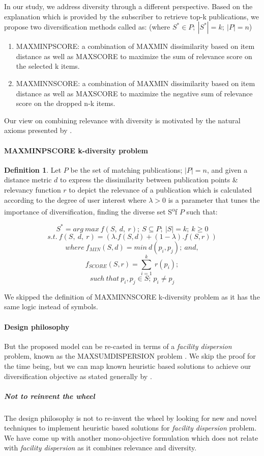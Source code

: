 \documentclass[a4paper,12pt,oneside]{book}
\theoremstyle{definition}
\newtheorem{definition}{Definition}[section]
\theoremstyle{remark}
\begin{document}
In our study, we address diversity through a different perspective. Based on the explanation which is provided by the subscriber to retrieve top-k publications, we propose two diversification methods called as: (where $S^* \in P;\ |S^*|=k;\ |P|=n$)
\begin{enumerate}
\item MAXMINPSCORE: a combination of MAXMIN dissimilarity based on item distance as well as MAXSCORE to maximize the sum of relevance score on the selected k items. 
\item MAXMINNSCORE: a combination of MAXMIN dissimilarity based on item distance as well as MAXSCORE to maximize the negative sum of relevance score on the dropped n-k items.
\end{enumerate}

Our view on combining relevance with diversity is motivated by the natural axioms presented by \cite{Gollapudi2009}. 

\paragraph*{MAXMINPSCORE k-diversity problem}
\begin{definition}
Let $P$ be the set of matching publications; $|P| = n$, and given a distance metric $d$ to express the dissimilarity between publication points \& relevancy function $r$ to depict the relevance of a publication which is calculated according to the degree of user interest where $\lambda > 0$ is a parameter that tunes the importance of diversification, finding the diverse set S\textsuperscript* of $P$ such that:

\begin{center}
\[ S^* = arg\ max\ f(S,\ d,\ r);\ S \subseteq P;\ |S| = k;\ k \geq 0 \]
\[s.t.\ f(S,\ d,\ r)= ( \lambda.f(S, d)+(1-\lambda).f(S, r) )\]
\[where\ f _{MIN} (S,d) = min\ d(p_{i}, p_{j});\ and,\]
\[ f _{SCORE} (S,r) = \sum_{i=1}^{k}\ r(p_i);\]
\[such\ that \ p_{i}, p_{j} \in S;\ p_{i} \neq p_{j} \]
\end{center}
\end{definition}

We skipped the definition of MAXMINNSCORE k-diversity problem as it has the same logic instead of symbols.
\paragraph{Design philosophy}
But the proposed model can be re-casted in terms of a \emph{facility dispersion} problem, known as the MAXSUMDISPERSION problem \cite{Gollapudi2009}. We skip the proof for the time being, but we can map known heuristic based solutions to achieve our diversification objective as stated generally by \cite{Gollapudi2009}.
\subparagraph{Not to reinvent the wheel}
The design philosophy is not to re-invent the wheel by looking for new and novel techniques to implement heuristic based solutions for \emph{facility dispersion} problem. We have come up with another mono-objective formulation which does not relate with \emph{facility dispersion} as it combines relevance and diversity.
\end{document}
